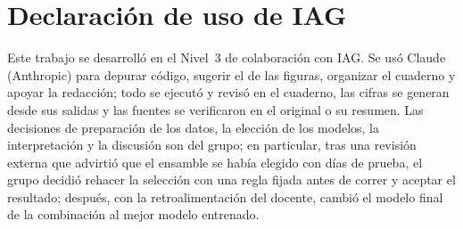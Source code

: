\documentclass[conference]{IEEEtran}
\begin{document}
\section*{Declaraci\'on de uso de IAG}
Este trabajo se desarroll\'o en el Nivel~3 de colaboraci\'on con IAG. Se us\'o Claude (Anthropic) para depurar c\'odigo, sugerir el de las figuras, organizar el cuaderno y apoyar la redacci\'on; todo se ejecut\'o y revis\'o en el cuaderno, las cifras se generan desde sus salidas y las fuentes se verificaron en el original o su resumen. Las decisiones de preparaci\'on de los datos, la elecci\'on de los modelos, la interpretaci\'on y la discusi\'on son del grupo; en particular, tras una revisi\'on externa que advirti\'o que el ensamble se hab\'ia elegido con d\'ias de prueba, el grupo decidi\'o rehacer la selecci\'on con una regla fijada antes de correr y aceptar el resultado; despu\'es, con la retroalimentaci\'on del docente, cambi\'o el modelo final de la combinaci\'on al mejor modelo entrenado.
\end{document}
